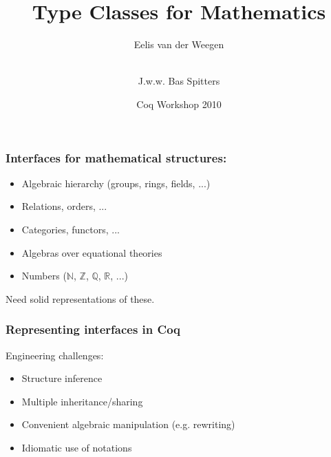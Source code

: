 \documentclass{beamer}
\title{Type Classes for Mathematics}
\author[Eelis van der Weegen et al.]{
Eelis van der Weegen \and \\
{\small J.w.w. Bas Spitters}}
\institute{Radboud University Nijmegen\\Formath EU project}
\date{Coq Workshop 2010}
\begin{document}
\begin{frame}\titlepage\end{frame}

\begin{frame}
\frametitle{Interfaces for mathematical structures:}


\begin{itemize}
\item Algebraic hierarchy (groups, rings, fields, ...)
\item Relations, orders, ...
\item Categories, functors, ...
\item Algebras over equational theories
\item Numbers ($\mathbb{N}$, $\mathbb{Z}$, $\mathbb{Q}$, $\mathbb{R}$, ...)
\end{itemize}
Need solid representations of these.
\end{frame}

\begin{frame}
\frametitle{Representing interfaces in Coq}

Engineering challenges:
\begin{itemize}
\item Structure inference
\item Multiple inheritance/sharing
\item Convenient algebraic manipulation (e.g. rewriting)
\item Idiomatic use of notations
\end{itemize}
\end{frame}
\end{document}
